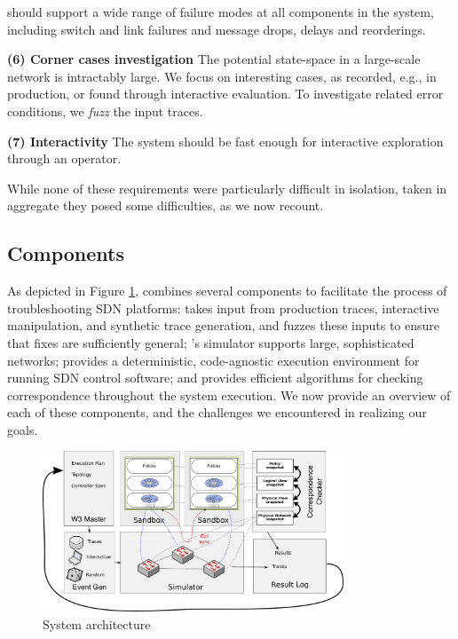  \projectname{} should
support a wide range of failure modes at all components in the
system, including switch and link failures and message drops, delays and reorderings.

\noindent\textbf{(6) Corner cases investigation} The potential state-space in a large-scale network
is intractably large. We focus on interesting cases, as recorded, e.g., in production, or
found through interactive evaluation. To investigate related error conditions,
we \emph{fuzz} the input traces.

\noindent\textbf{(7) Interactivity} The system should be fast enough for interactive exploration through
an operator.

\medskip

While none of these requirements were particularly difficult in isolation, taken in aggregate they posed some difficulties, as we now recount.

\subsection{Components}

As depicted in Figure \ref{fig:system}, \projectname{} combines several
components to facilitate the process of troubleshooting SDN platforms:
\projectname{} takes input
from production traces, interactive manipulation, and synthetic trace
generation, and fuzzes these inputs to ensure that fixes are sufficiently general;
\projectname{}'s simulator supports large, sophisticated networks;
\projectname{} provides a deterministic, code-agnostic execution environment
for running SDN control software; and provides efficient algorithms for
checking correspondence throughout the system execution. We now provide an
overview of each of these components, and the challenges we encountered in
realizing our goals.

\begin{figure}[!t]
  \centering
  \includegraphics[width=0.8\textwidth]{../diagrams/architecture/architecture.pdf}
  \caption{System architecture}
  \label{fig:system}
\end{figure}

